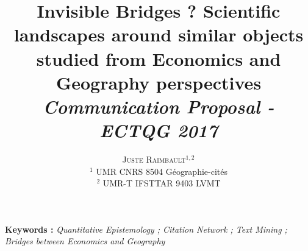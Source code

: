 \documentclass[11pt]{article}
\newcommand{\noun}[1]{\textsc{#1}}
\begin{document}
\title{\vspace{-2cm}Invisible Bridges ? Scientific landscapes around similar objects studied from Economics and Geography perspectives
\bigskip\\
\textit{Communication Proposal - ECTQG 2017}
}
\author{\noun{Juste Raimbault}$^{1,2}$\medskip\\
$^1$ UMR CNRS 8504 Géographie-cités\\
$^2$ UMR-T IFSTTAR 9403 LVMT
}
\date{}

\maketitle

\justify



\textbf{Keywords : }\textit{Quantitative Epistemology ; Citation Network ; Text Mining ; Bridges between Economics and Geography}

\medskip

\end{document}
